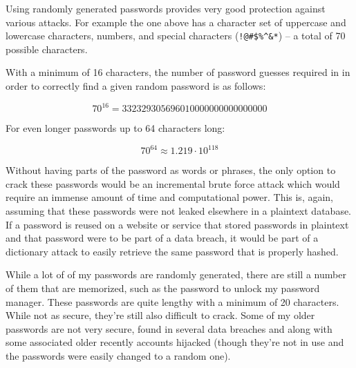 \documentclass[12pt]{exam}
\begin{document}
Using randomly generated passwords provides very good protection against various
attacks.  For example the one above has a character set of uppercase and
lowercase characters, numbers, and special characters (\lstinline{!@#$%^&*}) --
a total of 70 possible characters.

With a minimum of 16 characters, the number of password guesses required in
in order to correctly find a given random password is as follows:

$$70^{16} = 332329305696010000000000000000$$

For even longer passwords up to 64 characters long:

$$70^{64} \approx 1.219 \cdot 10^{118}$$

Without having parts of the password as words or phrases, the only option to
crack these passwords would be an incremental brute force attack which would
require an immense amount of time and computational power.  This is, again,
assuming that these passwords were not leaked elsewhere in a plaintext database.
If a password is reused on a website or service that stored passwords in
plaintext and that password were to be part of a data breach, it would be part
of a dictionary attack to easily retrieve the same password that is properly
hashed.

\vspace*{.51in}

While a lot of of my passwords are randomly generated, there are still a number
of them that are memorized, such as the password to unlock my password manager.
These passwords are quite lengthy with a minimum of 20 characters.  While not
as secure, they're still also difficult to crack.  Some of my older passwords
are not very secure, found in several data breaches and along with some
associated older recently accounts hijacked (though they're not in use and the
passwords were easily changed to a random one).  
\end{document}
